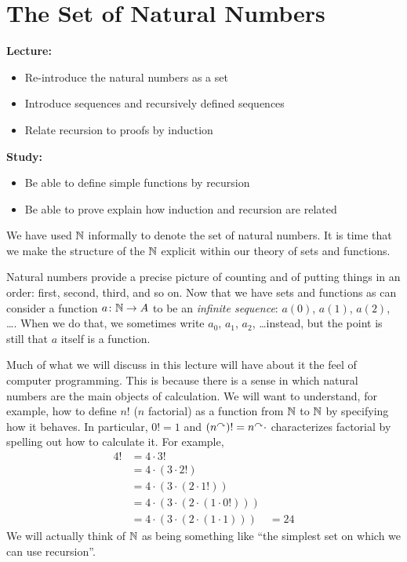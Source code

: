 \chapter{The Set of Natural Numbers}\label{lec:natural-numbers}

\begin{goals}
\noindent\textbf{Lecture:}
\begin{itemize}
	\item Re-introduce the natural numbers as a set
	\item Introduce sequences and recursively defined sequences
	\item Relate recursion to proofs by induction
\end{itemize}

\noindent\textbf{Study:}
\begin{itemize}
	\item Be able to define simple functions by recursion
	\item Be able to prove explain how induction and recursion are related
\end{itemize}
\end{goals}

We have used $\mathbb N$ informally to denote the set of natural numbers. 
It is time that we make the structure of the $\mathbb N$ explicit within our theory of sets and functions.

Natural numbers provide a precise picture of counting and of putting things in an order: first, second, third, and so on. Now that we have sets and functions as can consider a function ${a}\colon{\mathbb N}\to{A}$ to be an \emph{infinite sequence}: $a(0)$, $a(1)$, $a(2)$, \ldots. When we do that, we sometimes write $a_0$, $a_1$, $a_2$, \ldots instead, but the point is still that $a$ itself is a function.

Much of what we will discuss in this lecture will have about it the feel of computer programming. This is because there is a sense in which natural numbers are the main objects of calculation. We will want to understand, for example, how to define $n!$ ($n$ factorial) as a function from $\mathbb N$ to $\mathbb N$ by specifying how it behaves. In particular, $0! = 1$ and $(n^\curvearrowright)! = n^\curvearrowright\cdot$ characterizes factorial by spelling out how to calculate it. For example,
\begin{align*}
	4!  &= 4 \cdot 3! \\
		&= 4 \cdot (3 \cdot 2!)\\
		&= 4 \cdot (3 \cdot (2 \cdot 1!))\\
		&= 4 \cdot (3 \cdot (2 \cdot (1 \cdot 0!)))\\
		&= 4 \cdot (3 \cdot (2 \cdot (1 \cdot 1)))
		&= 24
\end{align*}
We will actually think of $\mathbb N$ as being something like ``the simplest set on which we can use recursion''.

